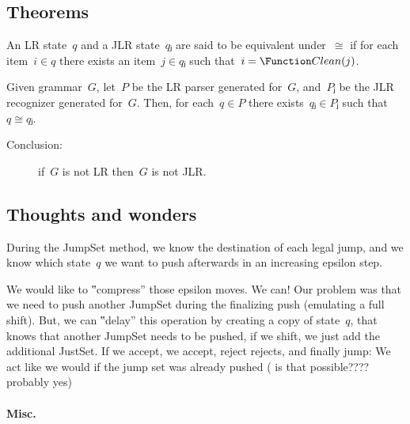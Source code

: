 \subsection{Theorems}
\begin{Definition}
  An LR state~$q$ and a JLR state~$qⱼ$ are said to be equivalent under~$≅$
    if for each item~$i∈q$ there exists an item~$j∈ qⱼ$ such that~$i = \Function
  Clean(j)$.
\end{Definition}

\begin{Lemma}
  Given grammar~$G$, let~$P$ be the LR parser generated for~$G$, and~$Pⱼ$ be
    the JLR recognizer generated for~$G$.
  Then, for each~$q∈P$ there exists~$qⱼ∈Pⱼ$ such that~$q≅qⱼ$.
\end{Lemma}
\begin{description}
  \item[Conclusion:] if~$G$ is not LR then~$G$ is not JLR.
\end{description}

\subsection{Thoughts and wonders}

During the JumpSet method, we know the destination of each legal jump,
and we know which state~$q$ we want to push afterwards in an increasing epsilon step.

We would like to ‟compress” those epsilon moves. We can!
Our problem was that we need to push another JumpSet during the finalizing push (emulating a full shift).
But, we can ‟delay” this operation by creating a copy of state~$q$, that knows that another JumpSet needs to be
pushed, if we shift, we just add the additional JustSet. If we accept, we accept, reject rejects, and finally jump:
We act like we would if the jump set was already pushed ( is that possible???? probably yes)
\paragraph{Misc.}

\endinput

\subsection{Between LR and JLR - A direct approach}
LR parsers are actually DPDAs\@. As we mentioned before in \cref{section:proof},~$ε$-moves
  fails the emulation of a DPDA, thus, in order to type-encode an LR parser, we first need
  to convert it to the encode-able jDPDA\@.

